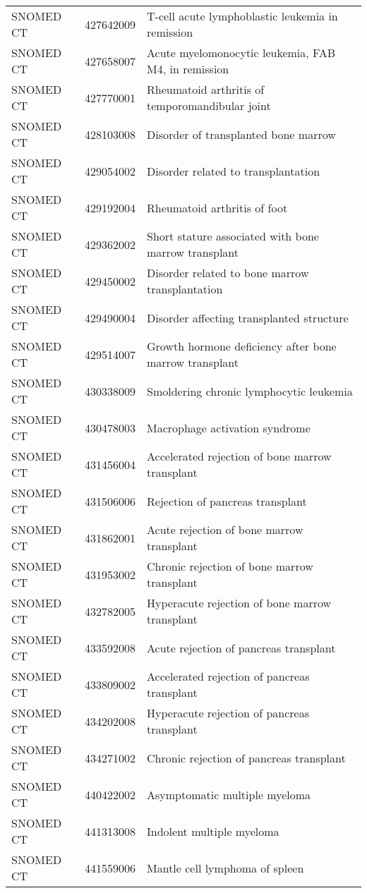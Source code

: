 \begin{longtable}{p{}p{}p{}}
  SNOMED CT & 427642009 & T-cell acute lymphoblastic leukemia in remission \\ 
  SNOMED CT & 427658007 & Acute myelomonocytic leukemia, FAB M4, in remission \\ 
  SNOMED CT & 427770001 & Rheumatoid arthritis of temporomandibular joint \\ 
  SNOMED CT & 428103008 & Disorder of transplanted bone marrow \\ 
  SNOMED CT & 429054002 & Disorder related to transplantation \\ 
  SNOMED CT & 429192004 & Rheumatoid arthritis of foot \\ 
  SNOMED CT & 429362002 & Short stature associated with bone marrow transplant \\ 
  SNOMED CT & 429450002 & Disorder related to bone marrow transplantation \\ 
  SNOMED CT & 429490004 & Disorder affecting transplanted structure \\ 
  SNOMED CT & 429514007 & Growth hormone deficiency after bone marrow transplant \\ 
  SNOMED CT & 430338009 & Smoldering chronic lymphocytic leukemia \\ 
  SNOMED CT & 430478003 & Macrophage activation syndrome \\ 
  SNOMED CT & 431456004 & Accelerated rejection of bone marrow transplant \\ 
  SNOMED CT & 431506006 & Rejection of pancreas transplant \\ 
  SNOMED CT & 431862001 & Acute rejection of bone marrow transplant \\ 
  SNOMED CT & 431953002 & Chronic rejection of bone marrow transplant \\ 
  SNOMED CT & 432782005 & Hyperacute rejection of bone marrow transplant \\ 
  SNOMED CT & 433592008 & Acute rejection of pancreas transplant \\ 
  SNOMED CT & 433809002 & Accelerated rejection of pancreas transplant \\ 
  SNOMED CT & 434202008 & Hyperacute rejection of pancreas transplant \\ 
  SNOMED CT & 434271002 & Chronic rejection of pancreas transplant \\ 
  SNOMED CT & 440422002 & Asymptomatic multiple myeloma \\ 
  SNOMED CT & 441313008 & Indolent multiple myeloma \\ 
  SNOMED CT & 441559006 & Mantle cell lymphoma of spleen \\ 

\end{longtable}
